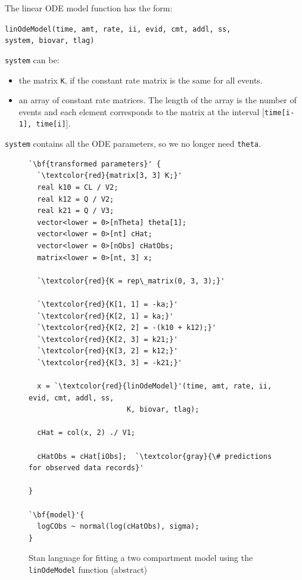 \documentclass[11pt]{amsart}
\newenvironment{fmpage}[1]
     {\begin{lrbox}{\fmbox}\begin{minipage}{#1}}
     {\end{minipage}\end{lrbox}\fbox{\usebox{\fmbox}}}
\begin{document}
The linear ODE model function has the form:

\texttt{linOdeModel(time, amt, rate, ii, evid, cmt, addl, ss,\\
\phantom{linOdeModel} system, biovar, tlag)}

\texttt{system} can be:
\begin{itemize}
  \item the matrix \texttt{K}, if the constant rate matrix is the same for all events.
  \item an array of constant rate matrices. The length of the array is the number of events and each element corresponds to the matrix at the interval [\texttt{time[i-1], time[i]}].
\end{itemize}
\texttt{system} contains all the ODE parameters, so we no longer need \texttt{theta}.

\clearpage

\begin{figure}[!htb]
\caption{Stan language for fitting a two compartment model using the \texttt{linOdeModel} function (abstract)}
\begin{center}
\begin{small}
\begin{fmpage}{\textwidth - .75in}
\begin{lstlisting}[basicstyle=\footnotesize\tiny\ttfamily,mathescape=true,flexiblecolumns=true,frame=single,escapeinside=`']
`\bf{transformed parameters}' {
  `\textcolor{red}{matrix[3, 3] K;}'
  real k10 = CL / V2;
  real k12 = Q / V2;
  real k21 = Q / V3;
  vector<lower = 0>[nTheta] theta[1];
  vector<lower = 0>[nt] cHat;
  vector<lower = 0>[nObs] cHatObs;
  matrix<lower = 0>[nt, 3] x;
 
  `\textcolor{red}{K = rep\_matrix(0, 3, 3);}'

  `\textcolor{red}{K[1, 1] = -ka;}'  
  `\textcolor{red}{K[2, 1] = ka;}' 
  `\textcolor{red}{K[2, 2] = -(k10 + k12);}' 
  `\textcolor{red}{K[2, 3] = k21;}' 
  `\textcolor{red}{K[3, 2] = k12;}' 
  `\textcolor{red}{K[3, 3] = -k21;}'

  x = `\textcolor{red}{linOdeModel}'(time, amt, rate, ii, evid, cmt, addl, ss,
                       K, biovar, tlag);

  cHat = col(x, 2) ./ V1;
  
  cHatObs = cHat[iObs];  `\textcolor{gray}{\# predictions for observed data records}'

}

`\bf{model}'{
  logCObs ~ normal(log(cHatObs), sigma);
}
\end{lstlisting}
\end{fmpage}
\end{small}
\end{center}
\label{LinTwoCptCode}
\end{figure}
\end{document}
